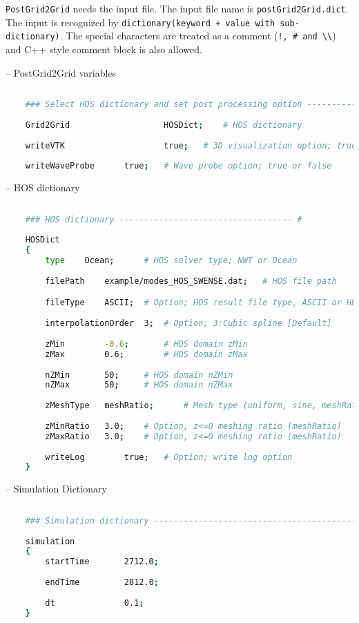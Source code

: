 	\texttt{PostGrid2Grid} needs the input file. The input file name is \texttt{postGrid2Grid.dict}. The input is recognized by \texttt{dictionary(keyword + value with sub-dictionary)}. The special characters are treated as a comment (\texttt{!, \# and \textbackslash\textbackslash}) and C++ style comment block is also allowed. 
	
	\vspace{0.5cm}
	
	-- PostGrid2Grid variables 
	
	\begin{lstlisting}[language=bash]
	
	### Select HOS dictionary and set post processing option ----------------------------------- #
	
	Grid2Grid					HOSDict;	# HOS dictionary
	
	writeVTK					true;	# 3D visualization option; true or false
	
	writeWaveProbe		true;	# Wave probe option; true or false

	\end{lstlisting}
	
	
	-- HOS dictionary
	
	\begin{lstlisting}[language=bash]
	
	### HOS dictionary ----------------------------------- #
	
	HOSDict
	{
		type	Ocean;		# HOS solver type; NWT or Ocean
		
		filePath	example/modes_HOS_SWENSE.dat;	# HOS file path

		fileType	ASCII;	# Option; HOS result file type, ASCII or HDF5
		
		interpolationOrder	3;	# Option; 3:Cubic spline [Default]
		
		zMin		-0.6;		# HOS domain zMin		
		zMax		0.6;		# HOS domain zMax
		
		nZMin		50;		# HOS domain nZMin
		nZMax		50;		# HOS domain nZMax
		
		zMeshType	meshRatio;		# Mesh type (uniform, sine, meshRatio)
		
		zMinRatio	3.0;	# Option, z<=0 meshing ratio (meshRatio)
		zMaxRatio	3.0;	# Option, z<=0 meshing ratio (meshRatio)
				
		writeLog        true;	# Option; write log option	
	}
	\end{lstlisting}
	
	-- Simulation Dictionary
		
	\begin{lstlisting}[language=bash]
	
	### Simulation dictionary ------------------------------------------- #
	
	simulation
	{
		startTime		2712.0;
	
		endTime			2812.0;
	
		dt	     		0.1;
	}	
	\end{lstlisting}
	
